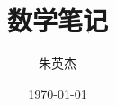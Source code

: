 \documentclass[12pt,a4paper]{ctexbook}
\title{数学笔记}
\author{朱英杰}
\date{\today}
\begin{document}
\setcounter{nproof}{1}  %
\newcommand{\nextproof}{\roman{nproof}\stepcounter{nproof}}


\maketitle
\newcommand{\wvert}{\,\vert\,}
\renewcommand{\newline}{~}

\tableofcontents













\end{document}
